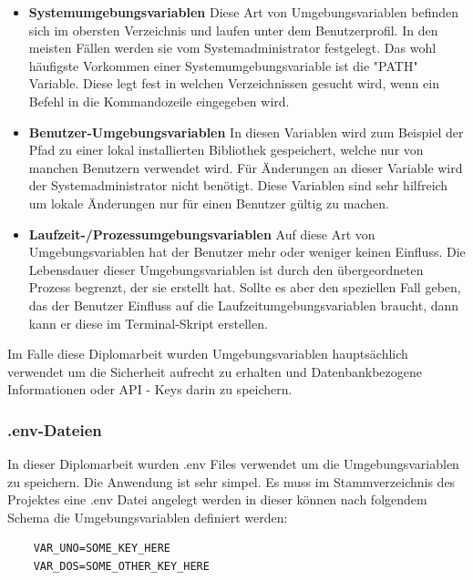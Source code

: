 \begin{itemize}
    \item \textbf{Systemumgebungsvariablen}
        \newline
        Diese Art von Umgebungsvariablen befinden sich im obersten Verzeichnis und laufen unter dem Benutzerprofil. In den meisten Fällen werden sie vom Systemadministrator festgelegt. Das wohl häufigste Vorkommen einer Systemumgebungsvariable ist die "PATH" Variable. Diese legt fest in welchen Verzeichnissen gesucht wird, wenn ein Befehl in die Kommandozeile eingegeben wird.
        \cite{Path_setzen}
        
    \item \textbf{Benutzer-Umgebungsvariablen}
        \newline
        In diesen Variablen wird zum Beispiel der Pfad zu einer lokal installierten Bibliothek gespeichert, welche nur von manchen Benutzern verwendet wird. Für Änderungen an dieser Variable wird der Systemadministrator nicht benötigt. Diese Variablen sind sehr hilfreich um lokale Änderungen nur für einen Benutzer gültig zu machen.
    \item \textbf{Laufzeit-/Prozessumgebungsvariablen}
        \newline
        Auf diese Art von Umgebungsvariablen hat der Benutzer mehr oder weniger keinen Einfluss. Die Lebensdauer dieser Umgebungsvariablen ist durch den übergeordneten Prozess begrenzt, der sie erstellt hat.
        Sollte es aber den speziellen Fall geben, das der Benutzer Einfluss auf die Laufzeitumgebungsvariablen braucht, dann kann er diese im Terminal-Skript erstellen.
\end{itemize}

Im Falle diese Diplomarbeit wurden Umgebungsvariablen hauptsächlich verwendet um die Sicherheit aufrecht zu erhalten und Datenbankbezogene Informationen oder API - Keys darin zu speichern.

\subsubsection{.env-Dateien}
In dieser Diplomarbeit wurden .env Files verwendet um die Umgebungsvariablen zu speichern. Die Anwendung ist sehr simpel. Es muss im Stammverzeichnis des Projektes eine .env Datei angelegt werden in dieser können nach folgendem Schema die Umgebungsvariablen definiert werden:
\begin{verbatim}
    VAR_UNO=SOME_KEY_HERE
    VAR_DOS=SOME_OTHER_KEY_HERE
\end{verbatim}

